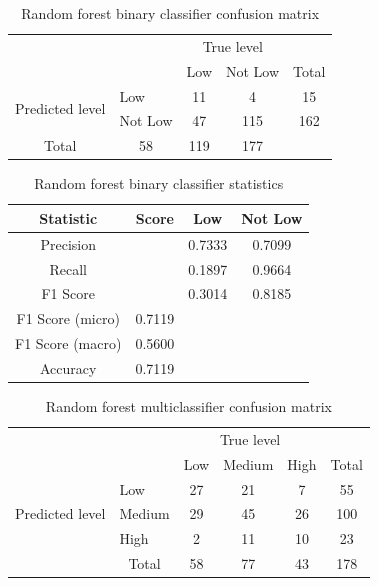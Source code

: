 \documentclass[12pt, a4paper]{article}
\begin{document}
\begin{table}[t!]
\centering
\begin{tabular}{l|l|c|c|c}
\multicolumn{2}{c}{}&\multicolumn{2}{c}{True level}&\\
\cline{3-4}
\multicolumn{2}{c|}{}&Low&Not Low&\multicolumn{1}{c}{Total}\\
\cline{2-4}
\multirow{2}{*}{Predicted level}& Low & 11 & 4 & 15\\
\cline{2-4}
& Not Low & 47 & 115 & 162\\
\cline{2-4}
\multicolumn{1}{c}{Total} & \multicolumn{1}{c}{58} & \multicolumn{    1}{c}{119} & \multicolumn{1}{c}{177}\\
\end{tabular}
\caption{Random forest binary classifier confusion matrix}
\label{table:rfcm_low}
\end{table}

\begin{table}[t!]
\centering
\begin{tabular}{||c c c c||} 
 \hline
 Statistic & Score & Low & Not Low  \\ [0.5ex] 
 \hline\hline
 Precision &  & 0.7333 & 0.7099 \\ 
 Recall & & 0.1897 & 0.9664 \\
 F1 Score &  & 0.3014 & 0.8185 \\
 F1 Score (micro) & 0.7119 & & \\
 F1 Score (macro)  & 0.5600 & &  \\ 
 Accuracy  & 0.7119 & & \\ [1ex] 
 \hline
\end{tabular}
\caption{Random forest binary classifier statistics}
\label{table:rfstat_low}
\end{table}



\begin{table}[t!]
\centering
\begin{tabular}{l|l|c|c|c|c}
\multicolumn{2}{c}{}&\multicolumn{3}{c}{True level}&\\
\cline{3-5}
\multicolumn{2}{c|}{}&Low&Medium&High&\multicolumn{1}{c}{Total}\\
\cline{2-5}
\multirow{3}{*}{Predicted level}& Low & 27 & 21 & 7 & 55\\
\cline{2-5}
& Medium & 29 & 45 & 26 & 100\\
\cline{2-5}
& High & 2 & 11 & 10 & 23\\
\cline{2-5}
\multicolumn{1}{c}{} & \multicolumn{1}{c}{Total} & \multicolumn{1}{c}{58} & \multicolumn{    1}{c}{77} & \multicolumn{    1}{c}{43} & \multicolumn{1}{c}{178}\\
\end{tabular}

\caption{Random forest multiclassifier confusion matrix}
\label{table:rfcm}
\end{table}
\end{document}
